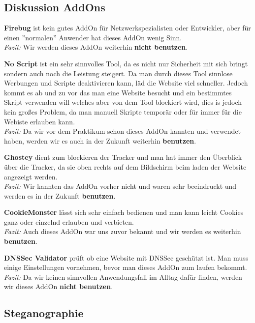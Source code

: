 \documentclass{scrartcl}
\begin{document}
  \subsection[Aufgabe 11 Diskussion AddOns]{Diskussion AddOns}
  
  \textbf{Firebug} ist kein gutes AddOn für Netzwerkspezialisten oder Entwickler, aber für einen ''normalen'' Anwender hat dieses AddOn wenig Sinn.\\ 
  \emph{Fazit:} Wir werden dieses AddOn weiterhin \textbf{nicht benutzen}.
  
  \textbf{No Script} ist ein sehr sinnvolles Tool, da es nicht nur Sicherheit mit sich bringt sondern auch noch die Leistung steigert. Da man durch dieses Tool sinnlose Werbungen und Scripte deaktivieren kann, läd die Website viel schneller. Jedoch kommt es ab und zu vor das man eine Website besucht und ein bestimmtes Skript verwenden will welches aber von dem Tool blockiert wird, dies is jedoch kein großes Problem, da man manuell Skripte temporär oder für immer für die Webiste erlauben kann. \\
  \emph{Fazit:} Da wir vor dem Praktikum schon dieses AddOn kannten und verwendet haben, werden wir es auch in der Zukunft weiterhin \textbf{benutzen}.
  
  \textbf{Ghostey} dient zum blockieren der Tracker und man hat immer den Überblick über die Tracker, da sie oben rechts auf dem Bildschirm beim laden der Website angezeigt werden.\\
  \emph{Fazit:} Wir kannten das AddOn vorher nicht und waren sehr beeindruckt und werden es in der Zukunft \textbf{benutzen}.
  
  \textbf{CookieMonster} lässt sich sehr einfach bedienen und man kann leicht Cookies ganz oder einzelnd erlauben und verbieten.\\
  \emph{Fazit:} Auch dieses AddOn war uns zuvor bekannt und wir werden es weiterhin \textbf{benutzen}.
  
  \textbf{DNSSec Validator} prüft ob eine Website mit DNSSec geschützt ist. Man muss einige Einstellungen vornehmen, bevor man dieses AddOn zum laufen bekommt.\\
  \emph{Fazit:} Da wir keinen sinnvollen Anwendungsfall im Alltag dafür finden, werden wir dieses AddOn \textbf{nicht benutzen}.
  
  
  \subsection[Aufgabe 12 Steganographie]{Steganographie}
  
\end{document}
